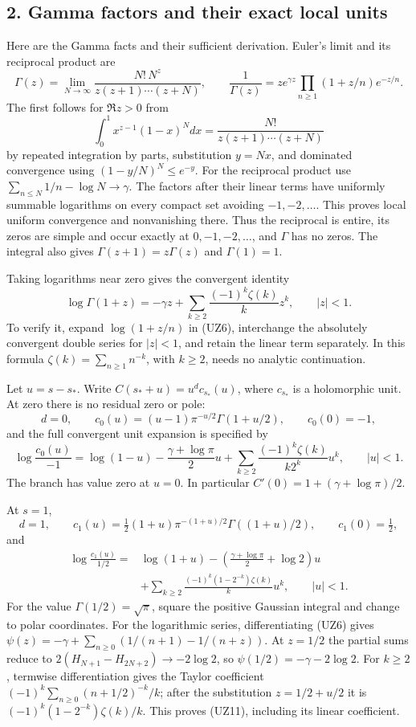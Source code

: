 \documentclass[
  10pt,
  a4paper,
]{article}
\begin{document}
\subsection{2. Gamma factors and their exact local
units}\label{gamma-factors-and-their-exact-local-units}

Here are the Gamma facts and their sufficient derivation. Euler's limit
and its reciprocal product are \[
\Gamma(z)=\lim_{N\to\infty}\frac{N!\,N^z}{z(z+1)\cdots(z+N)},\qquad
\frac1{\Gamma(z)}
=z e^{\gamma z}\prod_{n\ge1}(1+z/n)e^{-z/n}.
\tag{UZ6}
\] The first follows for \(\Re z>0\) from \[
\int_0^1x^{z-1}(1-x)^Ndx
=\frac{N!}{z(z+1)\cdots(z+N)}
\] by repeated integration by parts, substitution \(y=Nx\), and
dominated convergence using \((1-y/N)^N\le e^{-y}\). For the reciprocal
product use \(\sum_{n\le N}1/n-\log N\to\gamma\). The factors after
their linear terms have uniformly summable logarithms on every compact
set avoiding \(-1,-2,\ldots\). This proves local uniform convergence and
nonvanishing there. Thus the reciprocal is entire, its zeros are simple
and occur exactly at \(0,-1,-2,\ldots\), and \(\Gamma\) has no zeros.
The integral also gives \(\Gamma(z+1)=z\Gamma(z)\) and \(\Gamma(1)=1\).

Taking logarithms near zero gives the convergent identity \[
\log\Gamma(1+z)
=-\gamma z+\sum_{k\ge2}\frac{(-1)^k\zeta(k)}k z^k,\qquad |z|<1.
\tag{UZ7}
\] To verify it, expand \(\log(1+z/n)\) in (UZ6), interchange the
absolutely convergent double series for \(|z|<1\), and retain the linear
term separately. In this formula \(\zeta(k)=\sum_{n\ge1}n^{-k}\), with
\(k\ge2\), needs no analytic continuation.

Let \(u=s-s_*\). Write \(C(s_*+u)=u^d c_{s_*}(u)\), where \(c_{s_*}\) is
a holomorphic unit. At zero there is no residual zero or pole: \[
d=0,\qquad
c_0(u)=(u-1)\pi^{-u/2}\Gamma(1+u/2),\qquad c_0(0)=-1,
\tag{UZ8}
\] and the full convergent unit expansion is specified by \[
\log\frac{c_0(u)}{-1}
=\log(1-u)-\frac{\gamma+\log\pi}{2}u
+\sum_{k\ge2}\frac{(-1)^k\zeta(k)}{k2^k}u^k,\qquad |u|<1.
\tag{UZ9}
\] The branch has value zero at \(u=0\). In particular
\(C'(0)=1+(\gamma+\log\pi)/2\).

At \(s=1\), \[
d=1,\qquad
c_1(u)=\tfrac12(1+u)\pi^{-(1+u)/2}\Gamma((1+u)/2),\qquad
c_1(0)=\tfrac12,
\tag{UZ10}
\] and \[
\begin{aligned}
\log\frac{c_1(u)}{1/2}
={}&\log(1+u)
-\left(\frac{\gamma+\log\pi}{2}+\log2\right)u\\
&+\sum_{k\ge2}\frac{(-1)^k(1-2^{-k})\zeta(k)}k u^k,
\qquad |u|<1.
\end{aligned}\tag{UZ11}
\] For the value \(\Gamma(1/2)=\sqrt\pi\), square the positive Gaussian
integral and change to polar coordinates. For the logarithmic series,
differentiating (UZ6) gives
\(\psi(z)=-\gamma+\sum_{n\ge0}(1/(n+1)-1/(n+z))\). At \(z=1/2\) the
partial sums reduce to \(2(H_{N+1}-H_{2N+2})\to-2\log2\), so
\(\psi(1/2)=-\gamma-2\log2\). For \(k\ge2\), termwise differentiation
gives the Taylor coefficient \((-1)^k\sum_{n\ge0}(n+1/2)^{-k}/k\); after
the substitution \(z=1/2+u/2\) it is \((-1)^k(1-2^{-k})\zeta(k)/k\).
This proves (UZ11), including its linear coefficient.
\end{document}
